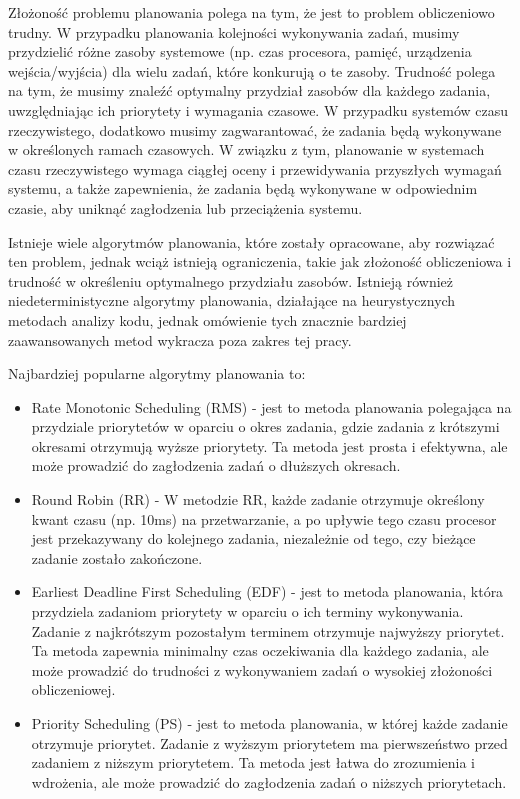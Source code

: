 Złożoność problemu planowania polega na tym, że jest to problem obliczeniowo trudny.
W przypadku planowania kolejności wykonywania zadań, musimy przydzielić różne zasoby systemowe (np. czas procesora, pamięć, urządzenia wejścia/wyjścia)
dla wielu zadań, które konkurują o te zasoby. Trudność polega na tym, że musimy znaleźć optymalny przydział zasobów dla każdego zadania,
uwzględniając ich priorytety i wymagania czasowe.
W przypadku systemów czasu rzeczywistego, dodatkowo musimy zagwarantować, że zadania będą wykonywane w określonych ramach czasowych.
W związku z tym, planowanie w systemach czasu rzeczywistego wymaga ciągłej oceny i przewidywania przyszłych wymagań systemu,
a także zapewnienia, że zadania będą wykonywane w odpowiednim czasie, aby uniknąć zagłodzenia lub przeciążenia systemu.

Istnieje wiele algorytmów planowania, które zostały opracowane, aby rozwiązać ten problem, jednak wciąż istnieją ograniczenia,
takie jak złożoność obliczeniowa i trudność w określeniu optymalnego przydziału zasobów. Istnieją również niedeterministyczne algorytmy planowania,
działające na heurystycznych metodach analizy kodu, jednak omówienie tych znacznie bardziej zaawansowanych metod wykracza poza zakres tej pracy.

Najbardziej popularne algorytmy planowania to:
\begin{itemize}
      \item Rate Monotonic Scheduling (RMS) - jest to metoda planowania polegająca na przydziale priorytetów w oparciu o okres zadania,
            gdzie zadania z krótszymi okresami otrzymują wyższe priorytety. Ta metoda jest prosta i efektywna, ale może prowadzić do zagłodzenia
            zadań o dłuższych okresach.
      \item Round Robin (RR) - W metodzie RR, każde zadanie otrzymuje określony kwant czasu (np. 10ms) na przetwarzanie,
            a po upływie tego czasu procesor jest przekazywany do kolejnego zadania, niezależnie od tego, czy bieżące zadanie zostało zakończone.
      \item Earliest Deadline First Scheduling (EDF) - jest to metoda planowania, która przydziela zadaniom priorytety w oparciu o ich terminy wykonywania.
            Zadanie z najkrótszym pozostałym terminem otrzymuje najwyższy priorytet. Ta metoda zapewnia minimalny czas oczekiwania dla każdego zadania,
            ale może prowadzić do trudności z wykonywaniem zadań o wysokiej złożoności obliczeniowej.
      \item Priority Scheduling (PS) - jest to metoda planowania, w której każde zadanie otrzymuje priorytet.
            Zadanie z wyższym priorytetem ma pierwszeństwo przed zadaniem z niższym priorytetem. Ta metoda jest łatwa do zrozumienia i wdrożenia,
            ale może prowadzić do zagłodzenia zadań o niższych priorytetach.
\end{itemize}

